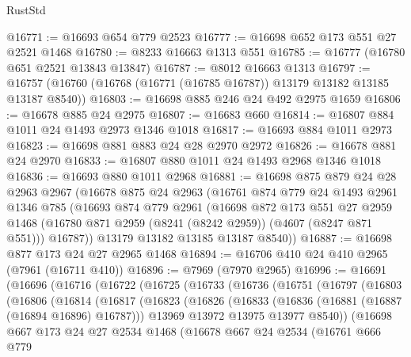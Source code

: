 \begin{lexlean}{RustStd}
\begin{coremodule}
@16771 := @16693 @654 @779 @2523
@16777 := @16698 @652 @173 @551 @27 @2521 @1468
@16780 := @8233 @16663 @1313 @551
@16785 := @16777 (@16780 @651 @2521 @13843 @13847)
@16787 := @8012 @16663 @1313
@16797 := @16757 (@16760 (@16768 (@16771 (@16785 @16787)) @13179 @13182 @13185 @13187 @8540))
@16803 := @16698 @885 @246 @24 @492 @2975 @1659
@16806 := @16678 @885 @24 @2975
@16807 := @16683 @660
@16814 := @16807 @884 @1011 @24 @1493 @2973 @1346 @1018
@16817 := @16693 @884 @1011 @2973
@16823 := @16698 @881 @883 @24 @28 @2970 @2972
@16826 := @16678 @881 @24 @2970
@16833 := @16807 @880 @1011 @24 @1493 @2968 @1346 @1018
@16836 := @16693 @880 @1011 @2968
@16881 := @16698
    @875
    @879
    @24
    @28
    @2963
    @2967
    (@16678
      @875
      @24
      @2963
      (@16761
        @874
        @779
        @24
        @1493
        @2961
        @1346
        @785
        (@16693
          @874
          @779
          @2961
          (@16698
            @872
            @173
            @551
            @27
            @2959
            @1468
            (@16780 @871 @2959 (@8241 (@8242 @2959)) (@4607 (@8247 @871 @551)))
            @16787))
        @13179
        @13182
        @13185
        @13187
        @8540))
@16887 := @16698 @877 @173 @24 @27 @2965 @1468
@16894 := @16706 @410 @24 @410 @2965 (@7961 (@16711 @410))
@16896 := @7969 (@7970 @2965)
@16996 := @16691
    (@16696
      (@16716
        (@16722
          (@16725
            (@16733
              (@16736
                (@16751
                  (@16797
                    (@16803
                      (@16806
                        (@16814
                          (@16817
                            (@16823
                              (@16826
                                (@16833
                                  (@16836 (@16881 (@16887 (@16894 @16896) @16787)))
                                  @13969
                                  @13972
                                  @13975
                                  @13977
                                  @8540))
                              (@16698
                                @667
                                @173
                                @24
                                @27
                                @2534
                                @1468
                                (@16678
                                  @667
                                  @24
                                  @2534
                                  (@16761
                                    @666
                                    @779

\end{coremodule}
\end{lexlean}
